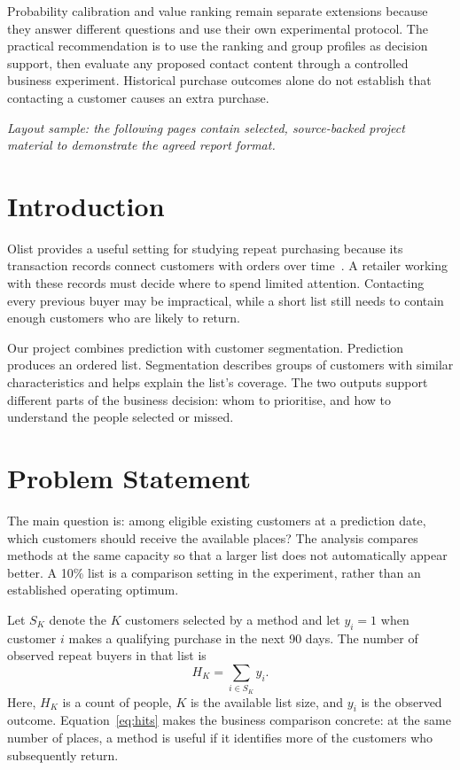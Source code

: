 \documentclass[11pt,a4paper,journal,onecolumn]{IEEEtran}
\begin{document}
Probability calibration and value ranking remain separate extensions because they answer different questions and use their own experimental protocol. The practical recommendation is to use the ranking and group profiles as decision support, then evaluate any proposed contact content through a controlled business experiment. Historical purchase outcomes alone do not establish that contacting a customer causes an extra purchase.

\vspace{5mm}\noindent\textit{Layout sample: the following pages contain selected, source-backed project material to demonstrate the agreed report format.}
\clearpage
\section{Introduction}
Olist provides a useful setting for studying repeat purchasing because its transaction records connect customers with orders over time~\cite{olist}. A retailer working with these records must decide where to spend limited attention. Contacting every previous buyer may be impractical, while a short list still needs to contain enough customers who are likely to return.

Our project combines prediction with customer segmentation. Prediction produces an ordered list. Segmentation describes groups of customers with similar characteristics and helps explain the list's coverage. The two outputs support different parts of the business decision: whom to prioritise, and how to understand the people selected or missed.

\section{Problem Statement}
The main question is: among eligible existing customers at a prediction date, which customers should receive the available places? The analysis compares methods at the same capacity so that a larger list does not automatically appear better. A 10\% list is a comparison setting in the experiment, rather than an established operating optimum.

Let $S_K$ denote the $K$ customers selected by a method and let $y_i=1$ when customer $i$ makes a qualifying purchase in the next 90 days. The number of observed repeat buyers in that list is
\begin{equation}
H_K=\sum_{i\in S_K}y_i.
\label{eq:hits}
\end{equation}
Here, $H_K$ is a count of people, $K$ is the available list size, and $y_i$ is the observed outcome. Equation~\eqref{eq:hits} makes the business comparison concrete: at the same number of places, a method is useful if it identifies more of the customers who subsequently return.
\end{document}
